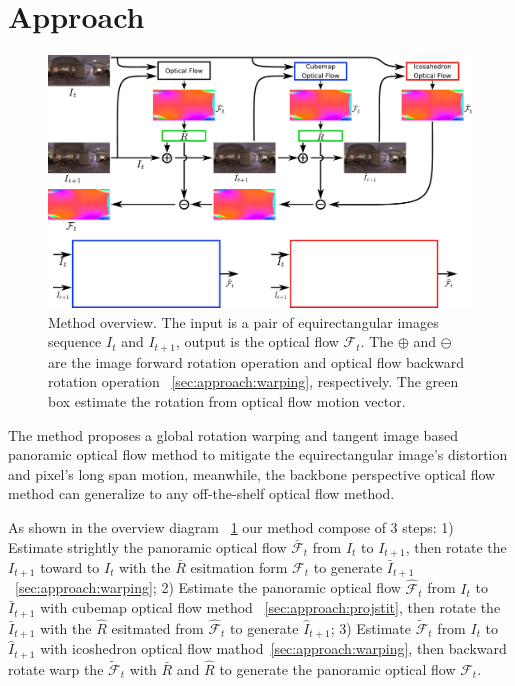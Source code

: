 \section{Approach}\label{sec:approach}

\begin{figure}[hbt!]
	\centering
	\includegraphics[width=0.95\linewidth]{images/method_pipeline_1.pdf}
	\caption{Method overview. The input is a pair of equirectangular images sequence $I_t$ and $I_{t+1}$, output is the optical flow $\mathcal{F}_t$. The $\oplus$ and  $\ominus$ are the image forward rotation operation and optical flow backward rotation operation ~\cref{sec:approach:warping}, respectively. The green box estimate the rotation from optical flow motion vector.}
	\label{fig:approach:pipeline}
\end{figure}

The method proposes a global rotation warping and tangent image based panoramic optical flow method to mitigate the equirectangular image's distortion and pixel's long span motion, meanwhile, the backbone perspective optical flow method can generalize to any  off-the-shelf optical flow method.

As shown in the overview diagram ~\cref{fig:approach:pipeline} our method compose of 3 steps:
1) Estimate strightly the panoramic optical flow $\bar{\mathcal{F}}_t$ from $I_{t}$ to ${I_{t+1}}$, then rotate the $I_{t+1}$ toward to $I_{t}$ with the $\bar{R}$ esitmation form $\mathcal{F}_t$ to generate ${\bar{I}}_{t+1}$~\cref{sec:approach:warping};
2) Estimate the panoramic optical flow ${\hat{\mathcal{F}}}_t$ from $I_{t}$ to ${\bar{I}}_{t+1}$ with cubemap optical flow method ~\cref{sec:approach:projstit}, then rotate the  ${\bar{I}}_{t+1}$ with the $\hat{R}$ esitmated from ${\hat{\mathcal{F}}}_t$ to generate ${\hat{I}}_{t+1}$;
3) Estimate $\tilde{\mathcal{F}}_t$ from $I_{t}$ to ${\hat{I}}_{t+1}$ with icoshedron optical flow mathod~\cref{sec:approach:warping}, then backward rotate warp the $\tilde{\mathcal{F}}_t$ with $\bar{R}$ and $\hat{R}$ to generate the panoramic optical flow $\mathcal{F}_t$.


